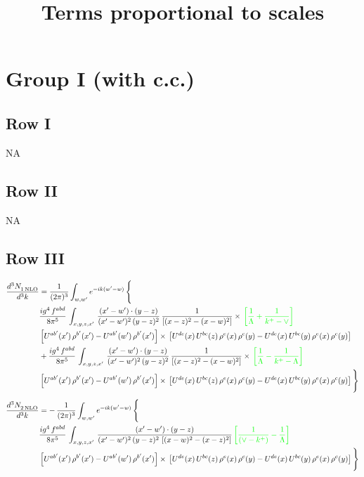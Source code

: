\documentclass[9pt]{article}
\title{Terms proportional to scales}
\author{}
\date{}
\numberwithin{equation}{section}
\begin{document}
\maketitle
\section{Group I (with c.c.)}
\subsection{Row I}
\textsc{NA}
\subsection{Row II}
\textsc{NA}
\subsection{Row III}
\begin{align}
   \frac{d^{3}N_{1\,\rm NLO}^{\rm}}{d^{3}k}  & = \frac{1}{(2\pi)^{3}}  \int_{w, w^\prime} e^{-ik(w^\prime-w)}\, \Bigg\{\notag \\ & \frac{ig^{4}\,f^{abd}}{8\pi^{5}}\,\int_{x,y,z,x'}\, \frac{(x'-w')\cdot (y-z)}{(x'-w')^{2}\,(y-z)^{2}}\, \frac{1}{\left[(x-z)^{2}-(x-w)^{2}\right]}\times\, {\color{green}\left[\frac{1}{\Lambda}+\frac{1}{k^{+}-\vee}\right]}\notag \\ & \left[U^{ab'}(x')\,\rho^{b'}(x')-U^{ab'}(w')\, \rho^{b'}(x')\right]\times\, \left[U^{de}(x)\,U^{bc}(z)\, \rho^{e}(x)\,\rho^{c}(y)-U^{de}(x)\,U^{bc}(y)\,\rho^{e}(x)\,\rho^{c}(y)\right]\notag \\ &  + \frac{ig^{4}\,f^{abd}}{8\pi^{5}}\,\int_{x,y,z,x'}\, \frac{(x'-w')\cdot (y-z)}{(x'-w')^{2}\,(y-z)^{2}}\, \frac{1}{\left[(x-z)^{2}-(x-w)^{2}\right]}\times\, {\color{green}\left[\frac{1}{\Lambda}-\frac{1}{k^{+}-\Lambda}\right]}\notag \\ & \left[U^{ab'}(x')\,\rho^{b'}(x')-U^{ab'}(w')\, \rho^{b'}(x')\right]\times\, \left[U^{de}(x)\,U^{bc}(z)\, \rho^{e}(x)\,\rho^{c}(y)-U^{de}(x)\,U^{bc}(y)\,\rho^{e}(x)\,\rho^{c}(y)\right]\Bigg\}
\end{align}
\begin{align}
   \frac{d^{3}N_{2\,\rm NLO}^{\rm}}{d^{3}k}  & = -\,\frac{1}{(2\pi)^{3}}  \int_{w, w^\prime} e^{-ik(w^\prime-w)}\, \Bigg\{\notag \\ & \frac{ig^{4}\, f^{abd}}{8\pi^{5}}\, \int_{x,y,z,x'}\,\frac{(x'-w')\cdot (y-z)}{(x'-w')^{2}\, (y-z)^{2}\,\left[(x-w)^{2}-(x-z)^{2}\right]}\,{\color{green}\left[\frac{1}{(\vee-k^{+})}-\frac{1}{\Lambda}\right]} \notag \\ & \left[U^{ab'}(x')\,\rho^{b'}(x')-U^{ab'}(w')\, \rho^{b'}(x')\right]\times\,\left[U^{de}(x)\,U^{bc}(z)\, \rho^{e}(x)\,\rho^{c}(y)-U^{de}(x)\,U^{bc}(y)\,\rho^{e}(x)\,\rho^{c}(y)\right]\Bigg\} 
\end{align}   
\end{document}
